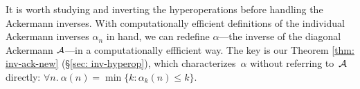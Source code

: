 It is worth studying and inverting the hyperoperations before handling the Ackermann inverses.
With computationally efficient definitions of the individual Ackermann inverses $\alpha_n$ in hand, we can redefine $\alpha$---the inverse of the diagonal Ackermann $\mathcal{A}$---in a computationally effficient way.  The key is our 
Theorem \ref{thm: inv-ack-new} (\S\ref{sec: inv-hyperop}), which characterizes~$\alpha$ without referring to~$\mathcal{A}$ directly: $\forall n.~ \alpha(n) = \min\big\{k : \alpha_k(n)\le k \big\}$.





